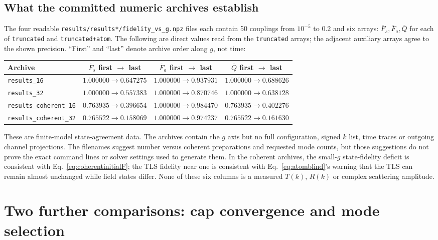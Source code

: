 \documentclass[11pt,a4paper]{article}
\newcommand{\code}[1]{\nolinkurl{#1}}
\begin{document}
\subsection{What the committed numeric archives establish}
The four readable \code{results/results*/fidelity_vs_g.npz} files each contain 50 couplings from $10^{-5}$ to $0.2$ and six arrays: $\overline F_s,\overline F_a,\overline Q$ for each of \code{truncated} and \code{truncated+atom}. The following are direct values read from the \code{truncated} arrays; the adjacent auxiliary arrays agree to the shown precision. ``First'' and ``last'' denote archive order along $g$, not time:
\begin{center}\small
\begin{tabular}{p{}ccc}
\toprule Archive & $\overline F_s$ first $\to$ last & $\overline F_a$ first $\to$ last & $\overline Q$ first $\to$ last\\\midrule
\code{results_16} & $1.000000\to0.647275$ & $1.000000\to0.937931$ & $1.000000\to0.688626$\\
\code{results_32} & $1.000000\to0.557383$ & $1.000000\to0.870746$ & $1.000000\to0.638128$\\
\code{results_coherent_16} & $0.763935\to0.396654$ & $1.000000\to0.984470$ & $0.763935\to0.402276$\\
\code{results_coherent_32} & $0.765522\to0.158069$ & $1.000000\to0.974237$ & $0.765522\to0.161630$\\
\bottomrule
\end{tabular}
\end{center}
These are finite-model state-agreement data. The archives contain the $g$ axis but no full configuration, signed $k$ list, time traces or outgoing channel projections. The filenames suggest number versus coherent preparations and requested mode counts, but those suggestions do not prove the exact command lines or solver settings used to generate them. In the coherent archives, the small-$g$ state-fidelity deficit is consistent with Eq.~\eqref{eq:coherentinitialF}; the TLS fidelity near one is consistent with Eq.~\eqref{eq:atomblind}'s warning that the TLS can remain almost unchanged while field states differ. None of these six columns is a measured $T(k)$, $R(k)$ or complex scattering amplitude.

\section{Two further comparisons: cap convergence and mode selection}
\label{sec:otherfidelities}
\end{document}
